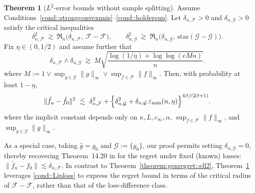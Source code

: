 \documentclass[11pt]{article}
\theoremstyle{plain}
\theoremstyle{definition} %
\newtheorem{theorem}{Theorem}
\begin{document}
\begin{theorem}[$L^2$-error bounds without sample splitting]
\label{theorem::insamplenuis}
Assume Conditions~\ref{cond::strongconvexnuis}--\ref{cond::holdersup}. Let
\(\delta_{n,\mathcal F}>0\) and \(\delta_{n,\mathcal G}>0\) satisfy the critical inequalities
\[
\delta_{n,\mathcal F}^2
\ \gtrsim\
\mathfrak{R}_n\bigl(\delta_{n,\mathcal F},\,\mathcal F-\mathcal F\bigr), \qquad \delta_{n,\mathcal G}^2
\ \gtrsim\
\mathfrak{R}_n\bigl(\delta_{n,\mathcal G},\,\mathrm{star}(\mathcal G-\mathcal G)\bigr).
\]
Fix \(\eta\in(0,1/2)\) and assume further that
\[
\delta_{n,\mathcal F} \wedge \delta_{n,\mathcal G}
\ \gtrsim\
M \sqrt{\frac{\log(1/\eta)+\log\log(eMn)}{n}}.
\]
where \(M:=1 \vee \sup_{g \in \mathcal{G}} \|g\|_\infty \vee \sup_{f \in \mathcal{F}} \|f\|_\infty\). Then, with
probability at least \(1-\eta\),
\[
\|\hat f_n-\hat f_0\|^2
\ \lesssim\
\delta_{n,\mathcal F}^2
+
\Bigl\{\delta_{n,\mathcal G}^2 + \delta_{n,\mathcal G} \, \varepsilon_{\mathrm{nuis}}(n,\eta)\Bigr\}^{4\beta /(2\beta+1)}.
\]
where the implicit constant depends only on \(\kappa, L, c_{\infty}, \alpha\),
\(\sup_{f\in\mathcal F}\|f\|_{\infty}\), and \(\sup_{g\in\mathcal G}\|g\|_{\infty}\).
\end{theorem}
As a special case, taking $\hat g = g_0$ and $\mathcal{G} := \{g_0\}$, our proof permits setting $\delta_{n,\mathcal G} = 0$, thereby recovering Theorem~14.20 in \cite{wainwright2019high} for the regret under fixed (known) losses: $\|\hat f_n - f_0\| \lesssim \delta_{n,\mathcal F}$. In contrast to Theorem~\ref{theorem:genregret::ell2}, Theorem~\ref{theorem::insamplenuis} leverages  \ref{cond::Liploss} to express the regret bound in terms of the critical radius of $\mathcal F - \mathcal F$, rather than that of the loss-difference class.
\end{document}
